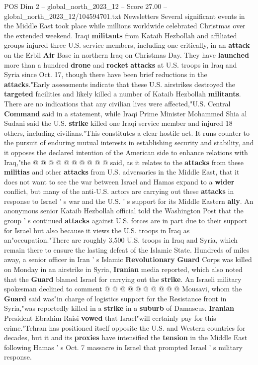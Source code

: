 \begin{textsample}{POS Dim 2 – global\_north\_2023\_12 – Score 27.00 – global\_north\_2023\_12/104594701.txt}  \label{ex:f2_pos_232}
Newsletters Several significant events in the Middle East took place while millions worldwide celebrated Christmas over the extended weekend.
Iraqi \textbf{militants} from Kataib Hezbollah and affiliated groups injured three U.S. service members, including one critically, in an \textbf{attack} on the Erbil \textbf{Air} Base in northern Iraq on Christmas Day.
They have \textbf{launched} more than a hundred \textbf{drone} and \textbf{rocket} \textbf{attacks} at U.S. troops in Iraq and Syria since Oct. 17, though there have been brief reductions in the \textbf{attacks}."Early assessments indicate that these U.S. airstrikes destroyed the \textbf{targeted} facilities and likely killed a number of Kataib Hezbollah \textbf{militants}.
There are no indications that any civilian lives were affected,"U.S.
Central \textbf{Command} said in a statement, while Iraqi Prime Minister Mohammed Shia al Sudani said the U.S. \textbf{strike} killed one Iraqi service member and injured 18 others, including civilians."This constitutes a clear hostile act.
It runs counter to the pursuit of enduring mutual interests in establishing security and stability, and it opposes the declared intention of the American side to enhance relations with Iraq,"the @ @ @ @ @ @ @ @ @ @ said, as it relates to the \textbf{attacks} from these \textbf{militias} and other \textbf{attacks} from U.S. adversaries in the Middle East, that it does not want to see the war between Israel and Hamas expand to a \textbf{wider} conflict, but many of the anti-U.S. actors are carrying out these \textbf{attacks} in response to Israel ' s war and the U.S. ' s support for its Middle Eastern \textbf{ally}.
An anonymous senior Kataib Hezbollah official told the Washington Post that the group ' s continued \textbf{attacks} against U.S. forces are in part due to their support for Israel but also because it views the U.S. troops in Iraq as an"occupation."There are roughly 3,500 U.S. troops in Iraq and Syria, which remain there to ensure the lasting defeat of the Islamic State.
Hundreds of miles away, a senior officer in Iran ' s Islamic \textbf{Revolutionary} \textbf{Guard} Corps was killed on Monday in an airstrike in Syria, \textbf{Iranian} media reported, which also noted that the \textbf{Guard} blamed Israel for carrying out the \textbf{strike}.
An Israeli military spokesman declined to comment @ @ @ @ @ @ @ @ @ @ Mousavi, whom the \textbf{Guard} said was"in charge of logistics support for the Resistance front in Syria,"was reportedly killed in a \textbf{strike} in a \textbf{suburb} of Damascus. \textbf{Iranian} President Ebrahim Raisi \textbf{vowed} that Israel"will certainly pay for this crime."Tehran has positioned itself opposite the U.S. and Western countries for decades, but it and its \textbf{proxies} have intensified the \textbf{tension} in the Middle East following Hamas ' s Oct. 7 massacre in Israel that prompted Israel ' s military response.

\end{textsample}
